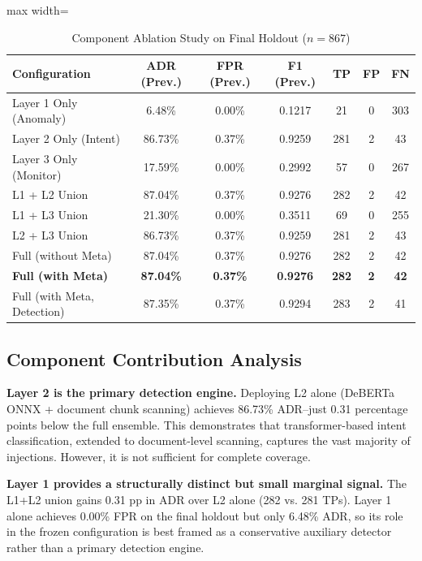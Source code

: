 \documentclass[conference]{IEEEtran}
\begin{document}
\begin{table}[!t]
\centering
\caption{Component Ablation Study on Final Holdout ($n = 867$)}
\label{tab:7}
\scriptsize
\begin{adjustbox}{max width=\textwidth}
\begin{tabular}{lcccccc}
\toprule
Configuration & ADR (Prev.) & FPR (Prev.) & F1 (Prev.) & TP & FP & FN \\
\midrule
Layer 1 Only (Anomaly) & 6.48\% & 0.00\% & 0.1217 & 21 & 0 & 303 \\
Layer 2 Only (Intent) & 86.73\% & 0.37\% & 0.9259 & 281 & 2 & 43 \\
Layer 3 Only (Monitor) & 17.59\% & 0.00\% & 0.2992 & 57 & 0 & 267 \\
L1 + L2 Union & 87.04\% & 0.37\% & 0.9276 & 282 & 2 & 42 \\
L1 + L3 Union & 21.30\% & 0.00\% & 0.3511 & 69 & 0 & 255 \\
L2 + L3 Union & 86.73\% & 0.37\% & 0.9259 & 281 & 2 & 43 \\
Full (without Meta) & 87.04\% & 0.37\% & 0.9276 & 282 & 2 & 42 \\
\textbf{Full (with Meta)} & \textbf{87.04\%} & \textbf{0.37\%} & \textbf{0.9276} & \textbf{282} & \textbf{2} & \textbf{42} \\
Full (with Meta, Detection) & 87.35\% & 0.37\% & 0.9294 & 283 & 2 & 41 \\
\bottomrule
\end{tabular}
\end{adjustbox}
\end{table}


\subsection{Component Contribution Analysis}

\textbf{Layer 2 is the primary detection engine.} Deploying L2 alone (DeBERTa ONNX + document chunk scanning) achieves 86.73\% ADR--just 0.31 percentage points below the full ensemble. This demonstrates that transformer-based intent classification, extended to document-level scanning, captures the vast majority of injections. However, it is not sufficient for complete coverage.


\textbf{Layer 1 provides a structurally distinct but small marginal signal.} The L1+L2 union gains 0.31 pp in ADR over L2 alone (282 vs. 281 TPs). Layer 1 alone achieves 0.00\% FPR on the final holdout but only 6.48\% ADR, so its role in the frozen configuration is best framed as a conservative auxiliary detector rather than a primary detection engine.
\end{document}
